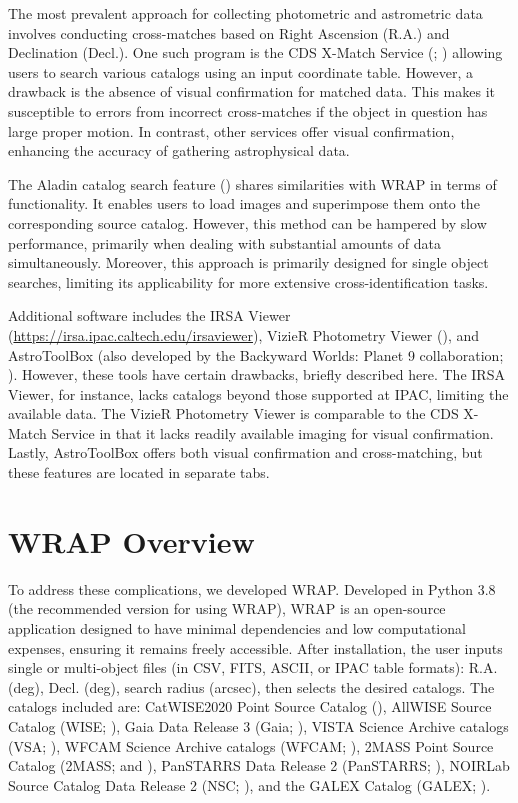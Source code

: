 \documentclass[twocolumn]{aastex631}
\begin{document}
The most prevalent approach for collecting photometric and astrometric data involves conducting cross-matches based on Right Ascension (R.A.) and Declination (Decl.). One such program is the CDS X-Match Service (\citealt{Boch et al.(2012)}; \citealt{Pineau et al.(2020)}) allowing users to search various catalogs using an input coordinate table.  However, a drawback is the absence of visual confirmation for matched data. This makes it susceptible to errors from incorrect cross-matches if the object in question has large proper motion. In contrast, other services offer visual confirmation, enhancing the accuracy of gathering astrophysical data.

The Aladin catalog search feature (\citealt{Bonnarel et al.(2000)}) shares similarities with WRAP in terms of functionality. It enables users to load images and superimpose them onto the corresponding source catalog. However, this method can be hampered by slow performance, primarily when dealing with substantial amounts of data simultaneously. Moreover, this approach is primarily designed for single object searches, limiting its applicability for more extensive cross-identification tasks.

Additional software includes the IRSA Viewer (\url{https://irsa.ipac.caltech.edu/irsaviewer}), VizieR Photometry Viewer (\citealt{Ochsenbein et al.(2000)}), and AstroToolBox (also developed by the Backyward Worlds: Planet 9 collaboration; \citealt{Kiwy(2022)}). However, these tools have certain drawbacks,  briefly described here. The IRSA Viewer, for instance, lacks catalogs beyond those supported at IPAC, limiting the available data. The VizieR Photometry Viewer is comparable to the CDS X-Match Service in that it lacks readily available imaging for visual confirmation. Lastly, AstroToolBox offers both visual confirmation and cross-matching, but these features are located in separate tabs.

\section{WRAP Overview} \label{WRAP}
To address these complications, we developed WRAP. Developed in Python 3.8 (the recommended version for using WRAP), WRAP is an open-source application designed to have minimal dependencies and low computational expenses, ensuring it remains freely accessible. After installation, the user inputs single or multi-object files (in CSV, FITS, ASCII, or IPAC table formats): R.A. (deg), Decl. (deg), search radius (arcsec), then selects the desired catalogs. The catalogs included are: CatWISE2020 Point Source Catalog (\citealt{Marocco et al.(2021)}), AllWISE Source Catalog (WISE; \citealt{Cutri et al.(2021)}), Gaia Data Release 3 (Gaia; \citealt{Gaia Collaboration et al.(2021)}), VISTA Science Archive catalogs (VSA; \citealt{Irwin et al.(2004)}), WFCAM Science Archive catalogs (WFCAM; \citealt{Hambly et al.(2008)}), 2MASS Point Source Catalog (2MASS; \citealt{Cutri et al.(2003)} and \citealt{Skrutskie et al.(2006)}), PanSTARRS Data Release 2 (PanSTARRS; \citealt{Chambers et al.(2016)}), NOIRLab Source Catalog Data Release 2 (NSC; \citealt{Nidever et al.(2021)}), and the GALEX Catalog (GALEX; \citealt{Martin et al.(2005)}). 
\end{document}
